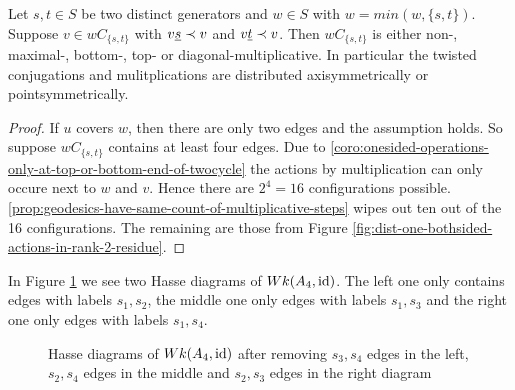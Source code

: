 \begin{lemm}
	Let $s,t \in S$ be two distinct generators and $w \in S$ with $w = min(w,\{s,t\})$. Suppose $v \in wC_{\{s,t\}}$ with $v \underline{s} \prec v$ and $v \underline{t} \prec v$. Then $wC_{\{s,t\}}$ is either non-, maximal-, bottom-, top- or diagonal-multiplicative. In particular the twisted conjugations and mulitplications are distributed axisymmetrically or pointsymmetrically.

	\begin{proof}
		If $u$ covers $w$, then there are only two edges and the assumption holds. So suppose $wC_{\{s,t\}}$ contains at least four edges. Due to \ref{coro:onesided-operations-only-at-top-or-bottom-end-of-twocycle} the actions by multiplication can only occure next to $w$ and $v$. Hence there are $2^4 = 16$ configurations possible. \ref{prop:geodesics-have-same-count-of-multiplicative-steps} wipes out ten out of the 16 configurations. The remaining are those from Figure \ref{fig:dist-one-bothsided-actions-in-rank-2-residue}.
	\end{proof}
\end{lemm}

\begin{exam}
	In Figure \ref{fig:a4_s1s3-and-a4_s2s4} we see two Hasse diagrams of $Wk(A_4, \operatorname{id})$. The left one only contains edges with labels $s_1,s_2$, the middle one only edges with labels $s_1,s_3$ and the right one only edges with labels $s_1,s_4$.
	\begin{figure}[ht]
		\centering
		
		\quad \quad
		
		\quad \quad
		
		\caption{Hasse diagrams of $Wk(A_4, \operatorname{id})$ after removing $s_3,s_4$ edges in the left, $s_2,s_4$ edges in the middle and $s_2,s_3$ edges in the right diagram}
		\label{fig:a4_s1s3-and-a4_s2s4}
	\end{figure}
\end{exam}

